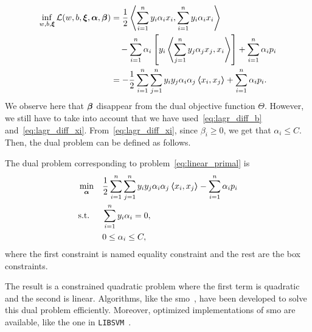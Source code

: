 \begin{equation}
    \nonumber
    \begin{aligned}
        \inf_{w, b, \bm{\xi}} \mathcal{L}(w, b, \bm{\xi}, \bm{\alpha}, \bm{\beta}) &= \frac{1}{2} \bm{\left\langle} \sum_{i=1}^n y_i \alpha_i x_i, \sum_{i=1}^n y_i \alpha_i x_i \bm{\right\rangle} \\
        &\quad- \sum_{i=1}^n \alpha_i \left[y_i \bm{\left\langle} \sum_{j=1}^n y_j \alpha_j x_j, x_i \bm{\right\rangle}  \right] + \sum_{i=1}^n \alpha_i p_i \\
        &= -\frac{1}{2} \sum_{i=1}^n \sum_{j=1}^n y_i y_j \alpha_i \alpha_j \bm{\left\langle} x_i, x_j \bm{\right\rangle} + \sum_{i=1}^n \alpha_i p_i .
    \end{aligned}
\end{equation}
We observe here that $\bm{\beta}$ disappear from the dual objective function $\Theta$. However, we still have to take into account that we have used~\eqref{eq:lagr_diff_b} and~\eqref{eq:lagr_diff_xi}. From~\eqref{eq:lagr_diff_xi}, since $\beta_i \geq 0$, we get that $\alpha_i \leq C$. Then, the dual problem can be defined as follows.
\begin{definition}
    The dual problem corresponding to problem~\eqref{eq:linear_primal} is
    \begin{equation}
        \label{eq:linear_dual}
        \begin{aligned}
            &\min_{\fv{\alpha}} & & \frac{1}{2} \sum_{i=1}^\nsamples \sum_{j=1}^\nsamples y_i y_j \alpha_i \alpha_j \dotp{x_i}{x_j} - \sum_{i=1}^\nsamples \alpha_i p_i \\
            & \text{s.t.} & & \sum_{i=1}^\nsamples y_i \alpha_i = 0 , \\
            & & & 0 \leq \alpha_i \leq C ,      
        \end{aligned}  
    \end{equation}
    where the first constraint is named equality constraint and the rest are the box constraints.
\end{definition}
The result is a constrained quadratic problem where the first term is quadratic and the second is linear. Algorithms, like the \acrfull{smo}~\citep{KeerthiSBM01}, have been developed to solve this dual problem efficiently. Moreover, optimized implementations of \acrshort{smo} are available, like the one in \texttt{LIBSVM}~\citep{ChangL11}.

